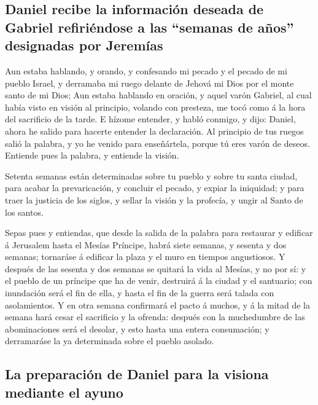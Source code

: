 \hypertarget{daniel-recibe-la-informaciuxf3n-deseada-de-gabriel-refiriuxe9ndose-a-las-semanas-de-auxf1os-designadas-por-jeremuxedas}{%
\subsection{Daniel recibe la información deseada de Gabriel refiriéndose
a las ``semanas de años'' designadas por
Jeremías}\label{daniel-recibe-la-informaciuxf3n-deseada-de-gabriel-refiriuxe9ndose-a-las-semanas-de-auxf1os-designadas-por-jeremuxedas}}

 Aun estaba hablando, y orando, y confesando mi pecado y el
pecado de mi pueblo Israel, y derramaba mi ruego delante de Jehová mi
Dios por el monte santo de mi Dios;  Aun estaba hablando en
oración, y aquel varón Gabriel, al cual había visto en visión al
principio, volando con presteza, me tocó como á la hora del sacrificio
de la tarde.  E hízome entender, y habló conmigo, y dijo:
Daniel, ahora he salido para hacerte entender la declaración.
 Al principio de tus ruegos salió la palabra, y yo he
venido para enseñártela, porque tú eres varón de deseos. Entiende pues
la palabra, y entiende la visión.

 Setenta semanas están determinadas sobre tu pueblo y sobre
tu santa ciudad, para acabar la prevaricación, y concluir el pecado, y
expiar la iniquidad; y para traer la justicia de los siglos, y sellar la
visión y la profecía, y ungir al Santo de los santos.

 Sepas pues y entiendas, que desde la salida de la palabra
para restaurar y edificar á Jerusalem hasta el Mesías Príncipe, habrá
siete semanas, y sesenta y dos semanas; tornaráse á edificar la plaza y
el muro en tiempos angustiosos.  Y después de las sesenta y
dos semanas se quitará la vida al Mesías, y no por sí: y el pueblo de un
príncipe que ha de venir, destruirá á la ciudad y el santuario; con
inundación será el fin de ella, y hasta el fin de la guerra será talada
con asolamientos.  Y en otra semana confirmará el pacto á
muchos, y á la mitad de la semana hará cesar el sacrificio y la ofrenda:
después con la muchedumbre de las abominaciones será el desolar, y esto
hasta una entera consumación; y derramaráse la ya determinada sobre el
pueblo asolado.

\hypertarget{la-preparaciuxf3n-de-daniel-para-la-visiona-mediante-el-ayuno}{%
\subsection{La preparación de Daniel para la visiona mediante el
ayuno}\label{la-preparaciuxf3n-de-daniel-para-la-visiona-mediante-el-ayuno}}

